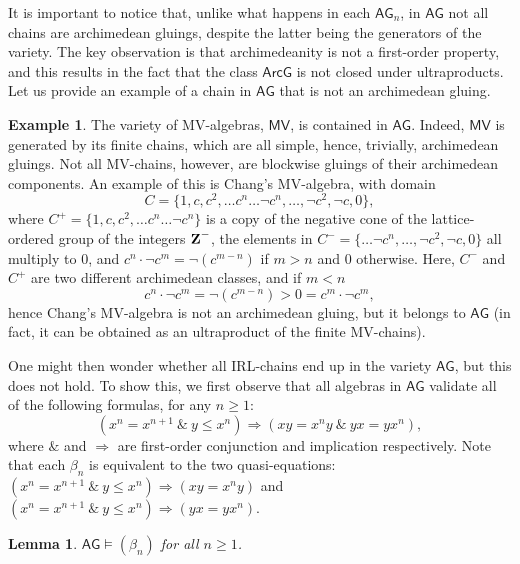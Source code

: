 \documentclass{amsart}
\newtheorem{lemma}[theorem]{Lemma}
\theoremstyle{definition}
\newtheorem{example}[theorem]{Example}
\numberwithin{equation}{section}
\newcommand{\alg}[1]{{\textbf{\upshape #1}}}  %
\newcommand{\vv}[1]{\mathsf {#1}}
\newcommand{\BlockG}{\vv{ArcG}}
\newcommand{\BG}{\vv{AG}}
\begin{document}
It is important to notice that, unlike what happens in each $\BG_n$, in $\BG$ not all chains are archimedean gluings, despite the latter being the generators of the variety. The key observation is that archimedeanity is not a first-order property, and this results in the fact that the class $\BlockG$ is not closed under ultraproducts. Let us provide an example of a chain in $\BG$ that is not an archimedean gluing.
\begin{example}
	The variety of MV-algebras, $\vv{MV}$, is contained in $\BG$. Indeed, $\vv{MV}$ is generated by its finite chains, which are all simple, hence, trivially, archimedean gluings. Not all MV-chains, however, are blockwise gluings of their archimedean components. An example of this is Chang's MV-algebra, with domain $$C= \{1, c, c^2, \ldots c^n \ldots \neg c^n, \ldots, \neg c^2, \neg c, 0\},$$
where $C^+ = \{1, c, c^2, \ldots c^n \ldots \neg c^n\}$ is a copy of the negative cone of the lattice-ordered group of the integers $\alg Z^-$, the elements in $C^- = \{\ldots \neg c^n, \ldots, \neg c^2, \neg c, 0\}$ all multiply to $0$, and $c^n \cdot \neg c^m = \neg (c^{m - n})$ if $m > n$ and $0$ otherwise. Here, $C^-$ and $C^+$ are two different archimedean classes, and if $m < n$ 
$$c^n \cdot \neg c^m = \neg (c^{m - n}) > 0 = c^m \cdot \neg c^m,$$
hence Chang's MV-algebra is not an archimedean gluing, but it belongs to $\BG$ (in fact, it can be obtained as an ultraproduct of the finite MV-chains).
\end{example}
One might then wonder whether all IRL-chains end up in the variety $\BG$, but this does not hold.
To show this, we first observe that all algebras in $\BG$ validate all of the following formulas, for any $n \geq 1$:
\begin{equation*}
	(x^n=x^{n+1}~\&~y \leq x^n) \Rightarrow (xy=x^ny ~\&~ yx=yx^n), \tag{$\beta_n$}
\end{equation*}
where $\&$ and $\Rightarrow$ are first-order conjunction and implication respectively. Note that each $\beta_n$ is equivalent to the two quasi-equations: $(x^n=x^{n+1}~\&~y \leq x^n) \Rightarrow (xy=x^ny)$ and $(x^n=x^{n+1}~\&~y \leq x^n) \Rightarrow (yx=yx^n)$.
\begin{lemma} \label{lemma: equations ast}
	$\BG\models (\beta_n)$ for all $n \geq 1$.
\end{lemma}
\end{document}
